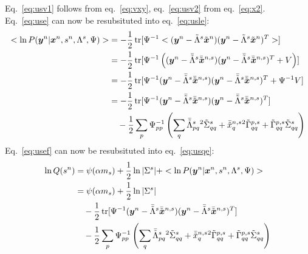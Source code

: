 \documentclass[a4paper]{article}
\begin{document}
Eq.~\ref{eq:usv1} follows from eq.~\ref{eq:vxy}, eq.~\ref{eq:usv2} from eq.~\ref{eq:x2}. \\
Eq.~\ref{eq:use} can now be resubsituted into eq.~\ref{eq:usle}:
\begin{align}
  <\ln P(\Xy|\Xx,\Xs,\Xl,\Psi)>
  &=-\frac{1}{2}\Xtr[\Xpsii <(\Xy-\Xlt\Xxt)(\Xy-\Xlt\Xxt)^T>] \\
  &=-\frac{1}{2}\Xtr[\Xpsii \left((\Xy-\Xltm\Xxtm)(\Xy-\Xltm\Xxtm)^T+V\right)] \\
  &=-\frac{1}{2}\Xtr[\Xpsii(\Xy-\Xltm\Xxtm)(\Xy-\Xltm\Xxtm)^T + \Xpsii V] \\
  &=-\frac{1}{2}\Xtr[\Xpsii(\Xy-\Xltm\Xxtm)(\Xy-\Xltm\Xxtm)^T] \nonumber \\
  &\quad-\frac{1}{2}\sum_p\Xpsii_{pp}\left(\sum_q\Xltmpq{}^2\Xxtv_{qq}+\Xxtmq{}^2\Xltvp_{qq}+\Xltvp_{qq}\Xxtv_{qq}\right) \label{eq:usef}
\end{align}
Eq.~\ref{eq:usef} can now be resubsituted into eq.~\ref{eq:usqe}:
\begin{align}
  \ln Q(\Xs)
  &=\psi(\alpha m_s)+\frac{1}{2}\ln |\Xxv|+<\ln P(\Xy|\Xx,\Xs,\Xl,\Psi)> \\
  &=\psi(\alpha m_s)+\frac{1}{2}\ln |\Xxv| \nonumber \\
  &\quad-\frac{1}{2}\Xtr[\Xpsii(\Xy-\Xltm\Xxtm)(\Xy-\Xltm\Xxtm)^T] \nonumber \\
  &\quad-\frac{1}{2}\sum_p\Xpsii_{pp}\left(\sum_q\Xltmpq{}^2\Xxtv_{qq}+\Xxtmq{}^2\Xltvp_{qq}+\Xltvp_{qq}\Xxtv_{qq}\right)
\end{align}



\end{document}
